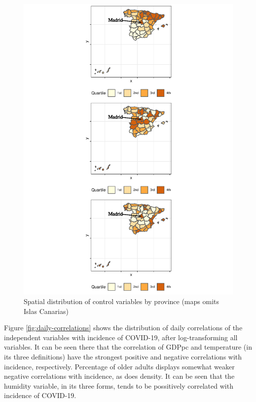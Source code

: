 \documentclass[]{elsarticle} %
\makeatletter
\def\maxwidth{\ifdim\Gin@nat@width>\linewidth\linewidth
\else\Gin@nat@width\fi}
\let\Oldincludegraphics\includegraphics
\renewcommand{\includegraphics}[1]{\Oldincludegraphics[width=\maxwidth]{#1}}
\makeatother
\begin{document}
\begin{figure}
\centering
\includegraphics{Environmental-Correlates-of-COVID19-Spain_files/figure-latex/map-controls-1.pdf}
\caption{\label{fig:map-controls}Spatial distribution of control
variables by province (maps omits Islas Canarias)}
\end{figure}

Figure \ref{fig:daily-correlations} shows the distribution of daily
correlations of the independent variables with incidence of COVID-19,
after log-transforming all variables. It can be seen there that the
correlation of GDPpc and temperature (in its three definitions) have the
strongest positive and negative correlations with incidence,
respectively. Percentage of older adults displays somewhat weaker
negative correlations with incidence, as does density. It can be seen
that the humidity variable, in its three forms, tends to be possitively
correlated with incidence of COVID-19.
\end{document}
